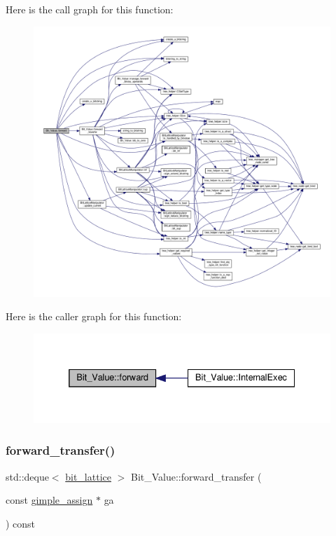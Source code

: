 Here is the call graph for this function\+:
\nopagebreak
\begin{figure}[H]
\begin{center}
\leavevmode
\includegraphics[width=350pt]{df/d4b/classBit__Value_ade90e85e32dd5a1c2c4d11c221a69fd2_cgraph}
\end{center}
\end{figure}
Here is the caller graph for this function\+:
\nopagebreak
\begin{figure}[H]
\begin{center}
\leavevmode
\includegraphics[width=332pt]{df/d4b/classBit__Value_ade90e85e32dd5a1c2c4d11c221a69fd2_icgraph}
\end{center}
\end{figure}
\mbox{\label{classBit__Value_abe0b4a87f9114bc82818b51dbdf0aca7}} 
\subsubsection{\texorpdfstring{forward\+\_\+transfer()}{forward\_transfer()}}
{\footnotesize\ttfamily std\+::deque$<$ \hyperlink{bit__lattice_8hpp_ab732360111c810c4eaeb4c8b81d160d6}{bit\+\_\+lattice} $>$ Bit\+\_\+\+Value\+::forward\+\_\+transfer (\begin{DoxyParamCaption}\item[{const \hyperlink{structgimple__assign}{gimple\+\_\+assign} $\ast$}]{ga }\end{DoxyParamCaption}) const\hspace{0.3cm}{\ttfamily [private]}}



